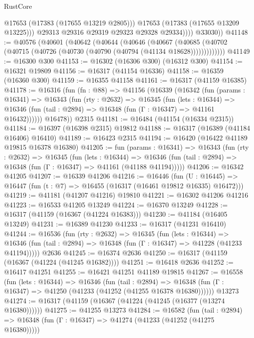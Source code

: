 \begin{lexlean}{RustCore}
\begin{coremodule}
                    @17653
                    (@17383 (@17655 @13219 @2805)))
                  @17653
                  (@17383 (@17655 @13209 @13225)))
                @29313
                @29316
                @29319
                @29323
                @29328
                @29334))))
        @33030))
@41148 := @40576
    (@40601
      (@40642
        (@40644
          (@40646
            (@40667
              (@40685 (@40702 (@40715 (@40726 (@40730 (@40790 (@40794 (@41134 @18628)))))))))))))
@41149 := @16300 @300
@41153 := @16302 (@16306 @300) (@16312 @300)
@41154 := @16321 @19809
@41156 := @16317 (@41154 @16336)
@41158 := @16359 (@16360 @300)
@41159 := @16355 @41158
@41161 := @16317 (@41159 @16385)
@41178 := @16316
    (fun (fn : @88) =>
    @41156
      (@16339
        (@16342
          (fun (params : @16341) =>
          @16343
            (fun (rty : @2632) =>
            @16345
              (fun (lets : @16344) =>
              @16346 (fun (tail : @2894) => @16348 (fun (Γ : @16347) => @41161 @16432))))))
        @16478))
    @2315
@41181 := @16484 (@41154 (@16334 @2315))
@41184 := @16397 (@16398 @2315) @19812
@41188 := @16317 (@16389 (@41184 @16406) @16410)
@41189 := @16423 @2315
@41194 := @16420 (@16422 @41189 @19815 @16378 @16380)
@41205 := fun (params : @16341) =>
  @16343
    (fun (rty : @2632) =>
    @16345
      (fun (lets : @16344) =>
      @16346 (fun (tail : @2894) => @16348 (fun (Γ : @16347) => @41161 (@41188 @41194)))))
@41206 := @16342 @41205
@41207 := @16339 @41206
@41216 := @16446
    (fun (U : @16445) => @16447 (fun (t : @7) => @16455 (@16317 (@16461 @19812 @16335) @16472)))
@41219 := @41181 (@41207 @41216) @19810
@41221 := @16302 @41206 @41216
@41223 := @16533 @41205 @13249
@41224 := @16370 @13249
@41228 := @16317 (@41159 (@16367 (@41224 @16383)))
@41230 := @41184 (@16405 @13249)
@41231 := @16389 @41230
@41233 := @16317 (@41231 @16410)
@41244 := @16536
    (fun (rty : @2632) =>
    @16345
      (fun (lets : @16344) =>
      @16346 (fun (tail : @2894) => @16348 (fun (Γ : @16347) => @41228 (@41233 @41194)))))
    @2636
@41245 := @16374 @2636
@41250 := @16317 (@41159 (@16367 (@41224 (@41245 @16382))))
@41251 := @16418 @2636
@41252 := @16417 @41251
@41255 := @16421 @41251 @41189 @19815
@41267 := @16558
    (fun (lets : @16344) =>
    @16346
      (fun (tail : @2894) =>
      @16348 (fun (Γ : @16347) => @41250 (@41233 (@41252 (@41255 @16378 @16380))))))
    @13273
@41274 := @16317 (@41159 (@16367 (@41224 (@41245 (@16377 (@13274 @16380))))))
@41275 := @41255 @13273
@41284 := @16582
    (fun (tail : @2894) => @16348 (fun (Γ : @16347) => @41274 (@41233 (@41252 (@41275 @16380)))))

\end{coremodule}
\end{lexlean}
